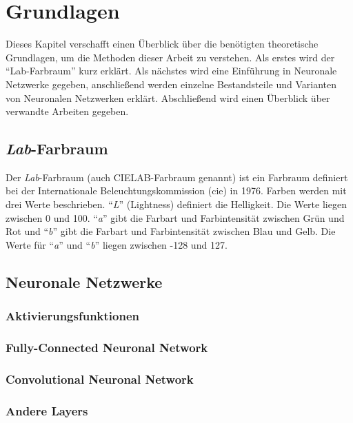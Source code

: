 \chapter{Grundlagen}
Dieses Kapitel verschafft einen Überblick über die benötigten theoretische Grundlagen, um die Methoden dieser Arbeit zu verstehen. Als
erstes wird der ``Lab-Farbraum'' kurz erklärt. Als nächstes wird eine Einführung in Neuronale Netzwerke gegeben, anschließend werden
einzelne Bestandsteile und Varianten von Neuronalen Netzwerken erklärt. Abschließend wird einen Überblick über verwandte Arbeiten gegeben.

\section{\textit{Lab}-Farbraum} 
Der \textit{Lab}-Farbraum (auch CIELAB-Farbraum genannt) ist ein Farbraum definiert bei der Internationale
Beleuchtungskommission (\gls{cie}) in 1976. Farben werden mit drei Werte beschrieben. ``\textit{L}'' (Lightness) definiert die Helligkeit.
Die Werte liegen zwischen 0 und 100. ``\textit{a}'' gibt die Farbart und Farbintensität zwischen Grün und Rot und ``\textit{b}'' gibt die
Farbart und Farbintensität zwischen Blau und Gelb. Die Werte für ``\textit{a}'' und ``\textit{b}'' liegen zwischen -128 und 127.


\section{Neuronale Netzwerke}


\subsection{Aktivierungsfunktionen}
\subsection{Fully-Connected Neuronal Network}
\subsection{Convolutional Neuronal Network}
\subsection{Andere Layers}
